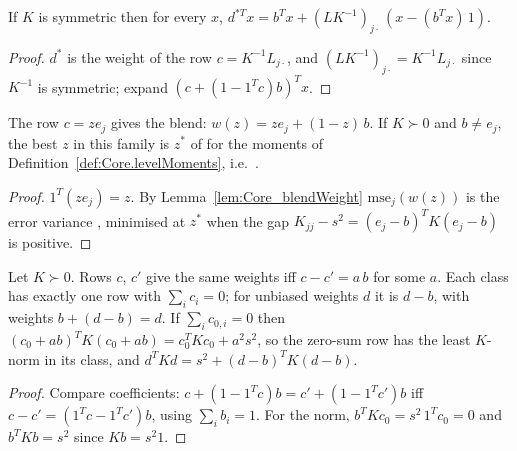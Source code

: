 \begin{theorem}\label{thm:Core_blup_residual}
  \leanok
  If $K$ is symmetric then for every $x$,
  $d^{*T}x = b^Tx + (LK^{-1})_{j\cdot}\,(x - (b^Tx)\,1)$.
\end{theorem}
\begin{proof}
  \leanok
  $d^*$ is the weight of the row $c = K^{-1}L_{j\cdot}$, and $(LK^{-1})_{j\cdot} = K^{-1}L_{j\cdot}$
  since $K^{-1}$ is symmetric; expand $(c + (1-1^Tc)b)^Tx$.
\end{proof}

\begin{corollary}\label{cor:Core_blend_residual}
  \leanok
  The row $c = z e_j$ gives the blend: $w(z) = z e_j + (1 - z)\,b$. If $K \succ 0$ and
  $b \ne e_j$, the best $z$ in this family is $z^*$ of  for the moments of
  Definition~\ref{def:Core.levelMoments}, i.e.\ .
\end{corollary}
\begin{proof}
  \leanok
  $1^T(ze_j) = z$. By Lemma~\ref{lem:Core_blendWeight} $\mathrm{mse}_j(w(z))$ is the error
  variance , minimised at $z^*$ when the gap $K_{jj} - s^2 = (e_j - b)^TK(e_j - b)$ is positive.
\end{proof}

\begin{theorem}\label{thm:Core_residual_gauge}
  \leanok
  Let $K \succ 0$. Rows $c$, $c'$ give the same weights iff $c - c' = a\,b$ for some $a$. Each class has
  exactly one row with $\sum_i c_i = 0$; for unbiased weights $d$ it is $d - b$, with weights $b + (d - b) = d$.
  If $\sum_i c_{0,i} = 0$ then $(c_0 + ab)^TK(c_0 + ab) = c_0^TKc_0 + a^2s^2$, so the zero-sum row
  has the least $K$-norm in its class, and $d^TKd = s^2 + (d - b)^TK(d - b)$.
\end{theorem}
\begin{proof}
  \leanok
  Compare coefficients: $c + (1 - 1^Tc)b = c' + (1 - 1^Tc')b$ iff $c - c' = (1^Tc - 1^Tc')b$, using
  $\sum_i b_i = 1$. For the norm, $b^TKc_0 = s^2\,1^Tc_0 = 0$ and $b^TKb = s^2$ since $Kb = s^2 1$.
\end{proof}

